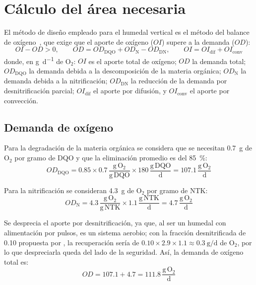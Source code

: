 \section{Cálculo del área necesaria}

El método de diseño empleado para el humedal vertical es el método del balance de oxígeno~\parencite{platzer1999design}, que exige que el aporte de oxígeno ($OI$) supere a la demanda ($OD$):
\begin{equation*}
  OI - OD > 0, \qquad OD = OD_{\mathrm{DQO}} + OD_{\mathrm{N}} - OD_{\mathrm{DN}}, \qquad OI = OI_{\mathrm{dif}} + OI_{\mathrm{conv}}
\end{equation*}
donde, en \unit{\gram\per\day} de O$_2$: $OI$ es el aporte total de oxígeno; $OD$ la demanda total; $OD_{\mathrm{DQO}}$ la demanda debida a la descomposición de la materia orgánica; $OD_{\mathrm{N}}$ la demanda debida a la nitrificación; $OD_{\mathrm{DN}}$ la reducción de la demanda por desnitrificación parcial; $OI_{\mathrm{dif}}$ el aporte por difusión, y $OI_{\mathrm{conv}}$ el aporte por convección.

\subsection{Demanda de oxígeno}

Para la degradación de la materia orgánica se considera que se necesitan \qty{0.7}{\gram} de O$_2$ por gramo de DQO y que la eliminación promedio es del \qty{85}{\percent}:
\begin{equation*}
  OD_{\mathrm{DQO}} = \num{0.85} \times \num{0.7}\,\frac{\mathrm{g\,O_2}}{\mathrm{g\,DQO}} \times 180\,\frac{\mathrm{g\,DQO}}{\mathrm{d}} = \num{107.1}\,\frac{\mathrm{g\,O_2}}{\mathrm{d}}
\end{equation*}

Para la nitrificación se consideran \qty{4.3}{\gram} de O$_2$ por gramo de NTK:
\begin{equation*}
  OD_{\mathrm{N}} = \num{4.3}\,\frac{\mathrm{g\,O_2}}{\mathrm{g\,NTK}} \times \num{1.1}\,\frac{\mathrm{g\,NTK}}{\mathrm{d}} = \num{4.7}\,\frac{\mathrm{g\,O_2}}{\mathrm{d}}
\end{equation*}

Se desprecia el aporte por desnitrificación, ya que, al ser un humedal con alimentación por pulsos, es un sistema aerobio; con la fracción desnitrificada de \num{0.10} propuesta por \textcite{platzer1999design}, la recuperación sería de $\num{0.10} \times \num{2.9} \times \num{1.1} \approx \qty{0.3}{\gram\per\day}$ de O$_2$, por lo que despreciarla queda del lado de la seguridad.
Así, la demanda de oxígeno total es:
\begin{equation*}
  OD = \num{107.1} + \num{4.7} = \num{111.8}\,\frac{\mathrm{g\,O_2}}{\mathrm{d}}
\end{equation*}


